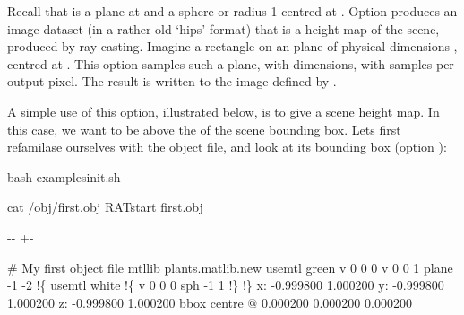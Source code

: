 \documentclass[letterpaper,10pt,english]{sphinxmanual}
\newlength\nbsphinxcodecellspacing
\begin{document}
Recall that  is a plane at  and a sphere or radius 1 centred at . Option  produces an image dataset (in a rather old ‘hips’ format) that is a height map of the scene, produced by ray casting. Imagine a rectangle on an  plane of physical dimensions , centred at . This option samples such a plane, with  dimensions, with  samples per output pixel. The result is written to the image defined by
.

A simple use of this option, illustrated below, is to give a scene height map. In this case, we want  to be above the  of the scene bounding box. Lets first re\sphinxhyphen{}familase ourselves with the object file, and look at its bounding box (option ):

{
\begin{sphinxVerbatim}[commandchars=\\\{\}]
\llap{\color{nbsphinxin}[18]:\,\hspace{\fboxrule}\hspace{\fboxsep}}\PYGZpc{}\PYGZpc{}bash
 examples\PYGZus{}init.sh

cat /obj/first.obj
   RATstart first.obj
\end{sphinxVerbatim}
}

{

\kern-\sphinxverbatimsmallskipamount\kern-\baselineskip
\kern+\FrameHeightAdjust\kern-\fboxrule
\vspace{\nbsphinxcodecellspacing}

\begin{sphinxVerbatim}[commandchars=\\\{\}]
\# My first object file
mtllib plants.matlib.new
usemtl green
v 0 0 0
v 0 0 1
plane -1 -2
!\{
usemtl white
!\{
v 0 0 0
sph -1 1
!\}
!\}
x: -0.999800 1.000200
y: -0.999800 1.000200
z: -0.999800 1.000200
bbox centre @ 0.000200 0.000200 0.000200
\end{sphinxVerbatim}
}
\end{document}
